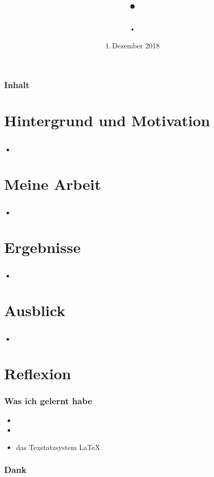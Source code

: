 \documentclass[11pt,german]{beamer}
\title{•\\
}
\author{•}
\date{1.\,Dezember 2018}
\begin{document}
\frame{\titlepage}   %

\begin{frame}
\frametitle{Inhalt}  %
\tableofcontents
\end{frame}

\section{Hintergrund und Motivation} %
\frame
{
	\frametitle{•}
}

\section{Meine Arbeit}
\frame
{
	\frametitle{•}
}

\section{Ergebnisse}
\frame
{
	\frametitle{•}
}

\section{Ausblick}
\frame
{
	\frametitle{•}
}

\section{Reflexion}
\frame
{
	\frametitle{Was ich gelernt habe}
	\begin{itemize}
		\item 
		\item 
		\item das Texstatzsystem \LaTeX
	\end{itemize}
}

\frame
{
	\frametitle{Dank}
}
\end{document}
